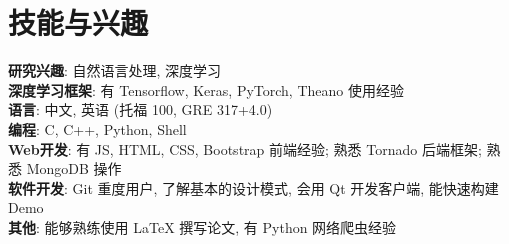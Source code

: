\section{技能与兴趣}
\textbf{研究兴趣}: 自然语言处理, 深度学习\\
\textbf{深度学习框架}: 有 Tensorflow, Keras, PyTorch, Theano 使用经验\\
\textbf{语言}: 中文, 英语 (托福 100, GRE 317+4.0)\\
\textbf{编程}: C, C++, Python, Shell\\
\textbf{Web开发}: 有 JS, HTML, CSS, Bootstrap 前端经验; 熟悉 Tornado 后端框架; 熟悉 MongoDB 操作\\
\textbf{软件开发}: Git 重度用户, 了解基本的设计模式, 会用 Qt 开发客户端, 能快速构建 Demo\\
\textbf{其他}: 能够熟练使用 LaTeX 撰写论文, 有 Python 网络爬虫经验\\

